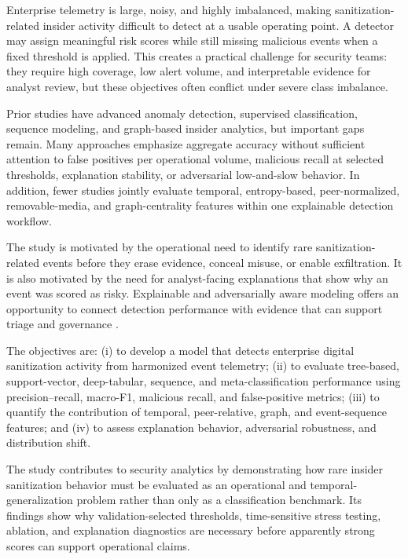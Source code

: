 \documentclass[journal]{IEEEtran}
\begin{document}
Enterprise telemetry is large, noisy, and highly imbalanced, making sanitization-related insider activity difficult to detect at a usable operating point. A detector may assign meaningful risk scores while still missing malicious events when a fixed threshold is applied. This creates a practical challenge for security teams: they require high coverage, low alert volume, and interpretable evidence for analyst review, but these objectives often conflict under severe class imbalance.

Prior studies have advanced anomaly detection, supervised classification, sequence modeling, and graph-based insider analytics, but important gaps remain. Many approaches emphasize aggregate accuracy without sufficient attention to false positives per operational volume, malicious recall at selected thresholds, explanation stability, or adversarial low-and-slow behavior. In addition, fewer studies jointly evaluate temporal, entropy-based, peer-normalized, removable-media, and graph-centrality features within one explainable detection workflow.

The study is motivated by the operational need to identify rare sanitization-related events before they erase evidence, conceal misuse, or enable exfiltration. It is also motivated by the need for analyst-facing explanations that show why an event was scored as risky. Explainable and adversarially aware modeling offers an opportunity to connect detection performance with evidence that can support triage and governance \cite{ali2023xai,rosati2023blackbox}.

The objectives are: (i) to develop a model that detects enterprise digital sanitization activity from harmonized event telemetry; (ii) to evaluate tree-based, support-vector, deep-tabular, sequence, and meta-classification performance using precision--recall, macro-F1, malicious recall, and false-positive metrics; (iii) to quantify the contribution of temporal, peer-relative, graph, and event-sequence features; and (iv) to assess explanation behavior, adversarial robustness, and distribution shift.

The study contributes to security analytics by demonstrating how rare insider sanitization behavior must be evaluated as an operational and temporal-generalization problem rather than only as a classification benchmark. Its findings show why validation-selected thresholds, time-sensitive stress testing, ablation, and explanation diagnostics are necessary before apparently strong scores can support operational claims.
\end{document}
